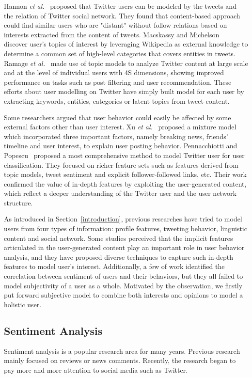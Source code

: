 \documentclass{acm_proc_article-sp}
\begin{document}
Hannon \emph{et al.}~\cite{Hannon:2010} proposed that Twitter users can be modeled by the tweets and the relation of Twitter social network.
They found that content-based approach could find similar users who are "distant" without follow relations based on interests extracted from the content of tweets. 
Macskassy and Michelson~\cite{conf/icwsm/MacskassyM11} discover user's topics of interest by leveraging Wikipedia as external knowledge to determine a common set of high-level categories that covers entities in tweets. 
Ramage \emph{et al.}~\cite{RamageEtAl:10} made use of topic models to analyze Twitter content at large scale and at the level of individual users with 4S dimensions, showing improved performance on tasks such as post filtering and user recommendation. 
These efforts about user modelling on Twitter have simply built model for each user by extracting keywords, entities, categories or latent topics from tweet content. 

Some researchers argued that user behavior could easily be affected by some external factors other than user interest.
Xu \emph{et al.}~\cite{Xu:2012MUP} proposed a mixture model which incorporated three important factors, namely breaking news, friends' timeline and user interest, to explain user posting behavior.
Pennacchiotti and Popescu~\cite{Pennacchiotti:icwsm11} proposed a most comprehensive method to model Twitter user for user classification. They focused on richer feature sets such as features derived from topic models, tweet sentiment and explicit follower-followed links, etc.
Their work confirmed the value of in-depth features by exploiting the user-generated content, which reflect a deeper understanding of the Twitter user and the user network structure.

As introduced in Section~\ref{introduction}, previous researches have tried to model users from four types of information: profile features, tweeting behavior, linguistic content and social network. 
Some studies perceived that the implicit features articulated in the user-generated content play an important role in user behavior analysis, and they have proposed diverse techniques to capture such in-depth features to model user's interest. 
Additionally, a few of work identified the correlation between sentiment of users and their behaviors, but they all failed to model subjectivity of a user as a whole.
Motivated by the observation, we firstly put forward subjective model to combine both interests and opinions to model a holistic user.

\subsection{Sentiment Analysis}
Sentiment analysis is a popular research area for many years. Previous research mainly focused on reviews or news comments. 
Recently, the research began to pay more and more attention to social media such as Twitter.
 
\end{document}
